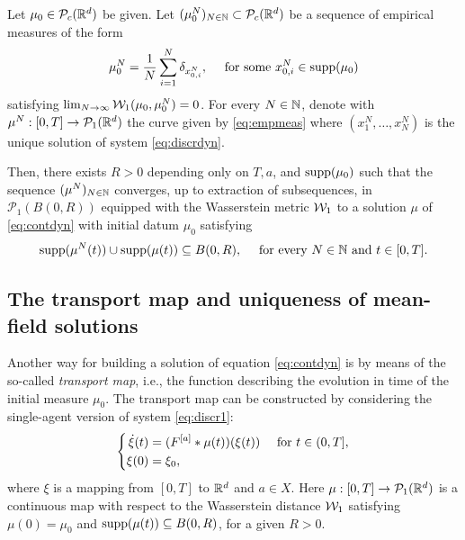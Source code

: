 \begin{proposition}\label{pr:exist}
Let $\mu_0 \in \mathcal{P}_c(\mathbb{R}^d)$ be given. Let $(\mu^{N}_0)_{N \in \mathbb{N}} \subset \mathcal{P}_c(\mathbb{R}^d)$ be a sequence of empirical measures of the form
\begin{align*}
\mu^{N}_0 = \frac{1}{N}\sum^N_{i = 1} \delta_{x^{N}_{0,i}}, \quad \text{ for some } x^{N}_{0,i} \in \operatorname{supp}(\mu_0)
\end{align*}
satisfying $\lim_{N \rightarrow \infty} \mathcal{W}_1(\mu_0,\mu^{N}_0) = 0$. For every $N \in \mathbb{N}$, denote with $\mu^N:[0,T] \rightarrow \mathcal{P}_1(\mathbb{R}^{d})$ the curve given by \eqref{eq:empmeas} where $(x^N_1,\ldots,x^N_N)$ is the unique solution of system \eqref{eq:discrdyn}.

Then, there exists $R > 0$ depending only on $T,a$, and $\operatorname{supp}(\mu_0)$ such that the sequence $(\mu^N)_{N \in \mathbb{N}}$ converges, up to extraction of subsequences, in $\mathcal{P}_1(B(0,R))$ equipped with the Wasserstein metric $\mathcal{W}_1$ to a solution $\mu$ of \eqref{eq:contdyn} with initial datum $\mu_0$ satisfying
\begin{align*}
\operatorname{supp}(\mu^N(t)) \cup \operatorname{supp}(\mu(t)) \subseteq B(0,R), \quad \text{ for every } N \in \mathbb{N} \text{ and } t \in [0,T].
\end{align*}
\end{proposition}

\subsection{The transport map and  uniqueness of mean-field solutions}

Another way for building a solution of equation \eqref{eq:contdyn} is by means of the so-called \textit{transport map}, i.e., the function describing the evolution in time of the initial measure $\mu_0$. The transport map can be constructed by considering the single-agent version of system \eqref{eq:discr1}:
\begin{align}\label{eq:transpdyn}
\left\{\begin{aligned}
\dot{\xi}(t) &= (F^{[a]}*\mu(t))(\xi(t)) \quad \text{ for } t \in (0,T],\\
\xi(0) &= \xi_0,
\end{aligned}\right.
\end{align}
where $\xi$ is a mapping from $[0,T]$ to $\mathbb{R}^d$ and $a \in X$. Here $\mu:[0,T]\rightarrow\mathcal{P}_1(\mathbb{R}^d)$ is a continuous map with respect to the Wasserstein distance $\mathcal{W}_1$ satisfying $\mu(0) = \mu_0$ and $\operatorname{supp}(\mu(t)) \subseteq B(0,R)$, for a given $R>0$.%

